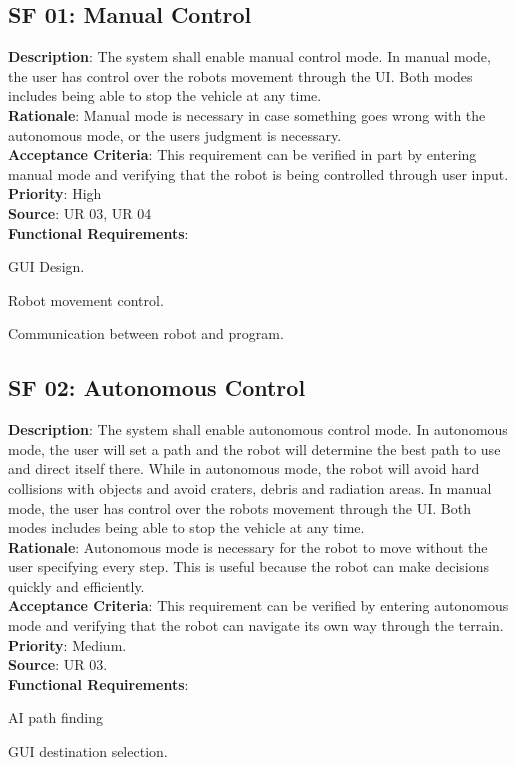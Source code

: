 \documentclass[12pt,a4paper]{article}
\renewenvironment{enumerate}[1]{\begin{compactenum}#1}{\end{compactenum}}
\begin{document}
    \subsection{SF 01: Manual Control}
    \textbf{Description}: The system shall enable manual control mode. In manual mode, the user has control over the robots movement through the UI. Both modes includes being able to stop the vehicle at any time.\\
    \textbf{Rationale}: Manual mode is necessary in case something goes wrong with the autonomous mode, or the users judgment is necessary.\\
    \textbf{Acceptance Criteria}: This requirement can be verified in part by entering manual mode and verifying that the robot is being controlled through user input.\\
    \textbf{Priority}: High\\
    \textbf{Source}: UR 03, UR 04\\
    \textbf{Functional Requirements}: \begin{enumerate}
    \item GUI Design.
    \item Robot movement control.
    \item Communication between robot and program.
    \end{enumerate}
    
  
    \subsection{SF 02: Autonomous Control}
    \textbf{Description}: The system shall enable autonomous control mode. In autonomous mode, the user will set a path and the robot will determine the best path to use and direct itself there. While in autonomous mode, the robot will avoid hard collisions with objects and avoid craters, debris and radiation areas.
    In manual mode, the user has control over the robots movement through the UI. Both modes includes being able to stop the vehicle at any time.\\
    \textbf{Rationale}: Autonomous mode is necessary for the robot to move without the user specifying every step. This is useful because the robot can make decisions quickly and efficiently.\\
    \textbf{Acceptance Criteria}: This requirement can be verified by entering autonomous mode and verifying that the robot can navigate its own way through the terrain.\\
    \textbf{Priority}: Medium.\\
    \textbf{Source}: UR 03.\\
    \textbf{Functional Requirements}: \begin{enumerate}
    \item AI path finding
    \item GUI destination selection.
    \end{enumerate}
    
\end{document}
